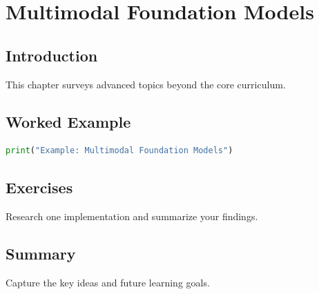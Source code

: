 \chapter{Multimodal Foundation Models}
\label{chap:vol13-2}



\section{Introduction}
This chapter surveys advanced topics beyond the core curriculum.

\section{Worked Example}
\begin{lstlisting}[language=Python]
print("Example: Multimodal Foundation Models")
\end{lstlisting}

\section{Exercises}
\begin{exercise}
Research one implementation and summarize your findings.
\end{exercise}

\section{Summary}
Capture the key ideas and future learning goals.
